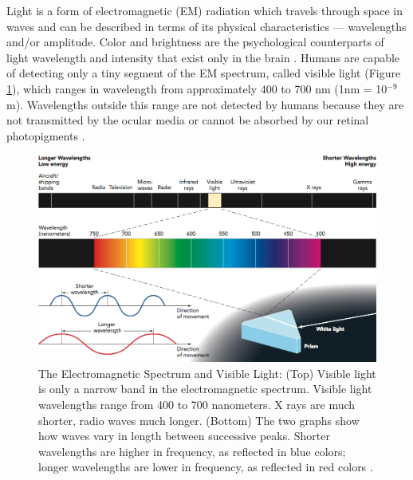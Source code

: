 Light is a form of electromagnetic (EM) radiation which travels through space in waves and can be described in terms of its physical characteristics --- wavelengths and/or amplitude. Color and brightness are the psychological counterparts of light wavelength and intensity that exist only in the brain \cite{King2012}. Humans are capable of detecting only a tiny segment of the EM spectrum, called visible light (Figure \ref{fig:spectrum}), which ranges in wavelength from approximately 400 to 700 nm (1nm = 10$^{-9}$m). 
Wavelengths outside this range are not detected by humans because they are not transmitted by the ocular media or cannot be absorbed by our retinal photopigments \citet{Schwartz2010}.

\begin{figure}[h]
	\centering
	\includegraphics[width=0.95\linewidth]{__Images/02/spectrum.png}
	\caption[The Electromagnetic Spectrum and Visible Light]{The Electromagnetic Spectrum and Visible Light: (Top) Visible light is only a narrow band in the electromagnetic spectrum. Visible light wavelengths range from 400 to 700 nanometers. X rays are much shorter, radio waves much longer. (Bottom) The two graphs show how waves vary in length between successive peaks. Shorter wavelengths are higher in frequency, as reflected in blue colors; longer wavelengths are lower in frequency, as reflected in red colors \cite{King2012}.}
	\label{fig:spectrum}
\end{figure}



